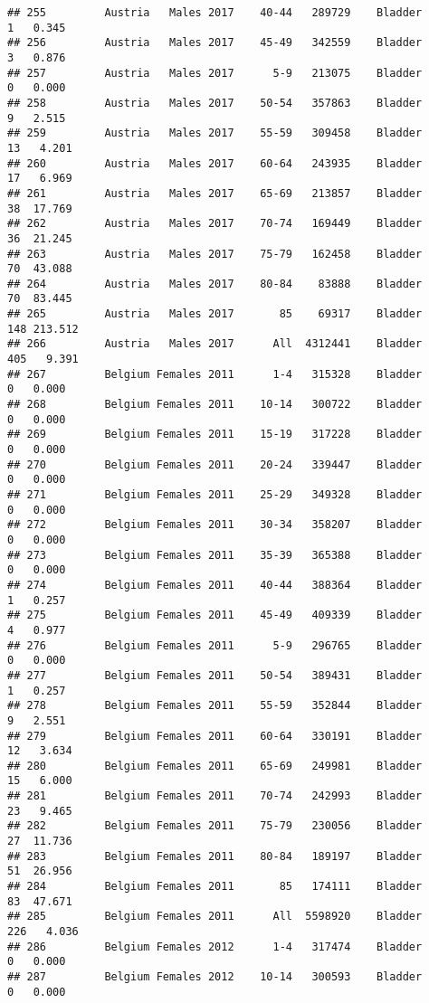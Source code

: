 \documentclass[
]{article}
\begin{document}
\begin{verbatim}
## 255         Austria   Males 2017    40-44   289729    Bladder      1   0.345
## 256         Austria   Males 2017    45-49   342559    Bladder      3   0.876
## 257         Austria   Males 2017      5-9   213075    Bladder      0   0.000
## 258         Austria   Males 2017    50-54   357863    Bladder      9   2.515
## 259         Austria   Males 2017    55-59   309458    Bladder     13   4.201
## 260         Austria   Males 2017    60-64   243935    Bladder     17   6.969
## 261         Austria   Males 2017    65-69   213857    Bladder     38  17.769
## 262         Austria   Males 2017    70-74   169449    Bladder     36  21.245
## 263         Austria   Males 2017    75-79   162458    Bladder     70  43.088
## 264         Austria   Males 2017    80-84    83888    Bladder     70  83.445
## 265         Austria   Males 2017       85    69317    Bladder    148 213.512
## 266         Austria   Males 2017      All  4312441    Bladder    405   9.391
## 267         Belgium Females 2011      1-4   315328    Bladder      0   0.000
## 268         Belgium Females 2011    10-14   300722    Bladder      0   0.000
## 269         Belgium Females 2011    15-19   317228    Bladder      0   0.000
## 270         Belgium Females 2011    20-24   339447    Bladder      0   0.000
## 271         Belgium Females 2011    25-29   349328    Bladder      0   0.000
## 272         Belgium Females 2011    30-34   358207    Bladder      0   0.000
## 273         Belgium Females 2011    35-39   365388    Bladder      0   0.000
## 274         Belgium Females 2011    40-44   388364    Bladder      1   0.257
## 275         Belgium Females 2011    45-49   409339    Bladder      4   0.977
## 276         Belgium Females 2011      5-9   296765    Bladder      0   0.000
## 277         Belgium Females 2011    50-54   389431    Bladder      1   0.257
## 278         Belgium Females 2011    55-59   352844    Bladder      9   2.551
## 279         Belgium Females 2011    60-64   330191    Bladder     12   3.634
## 280         Belgium Females 2011    65-69   249981    Bladder     15   6.000
## 281         Belgium Females 2011    70-74   242993    Bladder     23   9.465
## 282         Belgium Females 2011    75-79   230056    Bladder     27  11.736
## 283         Belgium Females 2011    80-84   189197    Bladder     51  26.956
## 284         Belgium Females 2011       85   174111    Bladder     83  47.671
## 285         Belgium Females 2011      All  5598920    Bladder    226   4.036
## 286         Belgium Females 2012      1-4   317474    Bladder      0   0.000
## 287         Belgium Females 2012    10-14   300593    Bladder      0   0.000

\end{verbatim}
\end{document}
